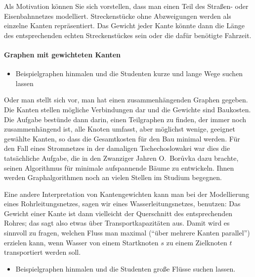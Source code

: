 Als Motivation können Sie sich vorstellen, dass man \zB einen Teil des
Straßen- oder Eisenbahnnetzes modelliert.
% 
Streckenstücke ohne Abzweigungen werden als einzelne Kanten
repräsentiert.
% 
Das Gewicht jeder Kante könnte dann \zB die Länge des entsprechenden
echten Streckenstückes sein oder die dafür benötigte Fahrzeit.
% 
\begin{tutorium} 
  \paragraph{Graphen mit gewichteten Kanten}
  \begin{itemize}
  \item Beispielgraphen hinmalen und die Studenten kurze und lange
Wege suchen lassen
  \end{itemize}
\end{tutorium}
% 
Oder man stellt sich vor, man hat einen zusammenhängenden Graphen
gegeben.
% 
Die Kanten stellen mögliche Verbindungen dar und die Gewichte sind
Baukosten.
% 
Die Aufgabe bestünde dann darin, einen Teilgraphen zu finden, der
immer noch zusammenhängend ist, alle Knoten umfasst, aber möglichst
wenige, geeignet gewählte Kanten, so dass die Gesamtkosten für den Bau
minimal werden.
% 
Für den Fall eines Stromnetzes in der damaligen Tschechoslowakei war
dies die tatsächliche Aufgabe, die in den Zwanziger Jahren
O.~Bor\r{u}vka dazu brachte, seinen Algorithmus für minimale
aufspannende Bäume zu entwickeln.
% 
Ihnen werden Graphalgorithmen noch an vielen Stellen im Studium
begegnen.

Eine andere Interpretation von Kantengewichten kann man bei der
Modellierung eines Rohrleitungsnetzes, sagen wir eines
Wasserleitungsnetzes, benutzen: Das Gewicht einer Kante ist dann
vielleicht der Querschnitt des entsprechenden Rohres; das sagt also
etwas über Transportkapazitäten aus.
% 
Damit wird es sinnvoll zu fragen, welchen Fluss man maximal ("`über
mehrere Kanten parallel"') erzielen kann, wenn Wasser von einem
Startknoten $s$ zu einem Zielknoten $t$ transportiert werden soll.
% 
\begin{tutorium}
  
  \begin{itemize}
  \item Beispielgraphen hinmalen und die Studenten große Flüsse suchen
    lassen.
  \end{itemize}
\end{tutorium}

